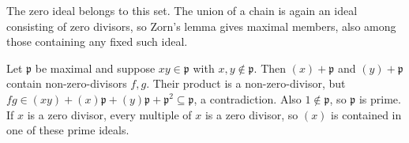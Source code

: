 The zero ideal belongs to this set. The union of a chain is again an ideal consisting of zero divisors, so Zorn's lemma gives maximal members, also among those containing any fixed such ideal.

Let $\mathfrak p$ be maximal and suppose $xy\in\mathfrak p$ with $x,y\notin\mathfrak p$. Then $(x)+\mathfrak p$ and $(y)+\mathfrak p$ contain non-zero-divisors $f,g$. Their product is a non-zero-divisor, but $fg\in(xy)+(x)\mathfrak p+(y)\mathfrak p+\mathfrak p^2\subseteq\mathfrak p$, a contradiction. Also $1\notin\mathfrak p$, so $\mathfrak p$ is prime. If $x$ is a zero divisor, every multiple of $x$ is a zero divisor, so $(x)$ is contained in one of these prime ideals.
